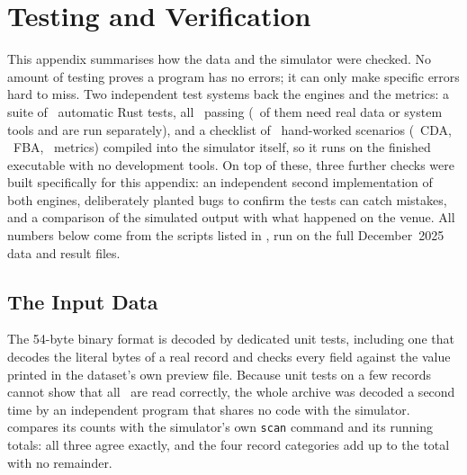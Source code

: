\chapter{Testing and Verification}
\label{app:testing}

This appendix summarises how the data and the simulator were checked. No amount of
testing proves a program has no errors; it can only make specific errors hard to
miss. Two independent test systems back the engines and the metrics: a suite of
\VerTestsTotal\ automatic Rust tests, all \VerTestsPassed\ passing (\VerTestsIgnored\ of
them need real data or system tools and are run separately), and a checklist of
\VerChecklistTotal\ hand-worked scenarios (\VerChecklistCda\ CDA, \VerChecklistFba\
FBA, \VerChecklistMet\ metrics) compiled into the simulator itself, so it runs on the
finished executable with no development tools. On top of these, three further checks
were built specifically for this appendix: an independent second implementation of
both engines, deliberately planted bugs to confirm the tests can catch
mistakes, and a comparison of the simulated output with what happened on the
venue. All numbers below come from the scripts listed in , run
on the full December~2025 data and result files.

\section{The Input Data}
\label{sec:testdata}
\label{sec:testfiles}

The 54-byte binary format is decoded by dedicated unit tests, including one that
decodes the literal bytes of a real record and checks every field against the
value printed in the dataset's own preview file. Because unit tests on a few
records cannot show that all \VerRecords\ are read correctly, the whole archive was
decoded a second time by an independent program that shares no code with the
simulator. \Cref{tab:testcounts} compares its counts
with the simulator's own \texttt{scan} command and its running totals: all three
agree exactly, and the four record categories add up to the total with no remainder.

